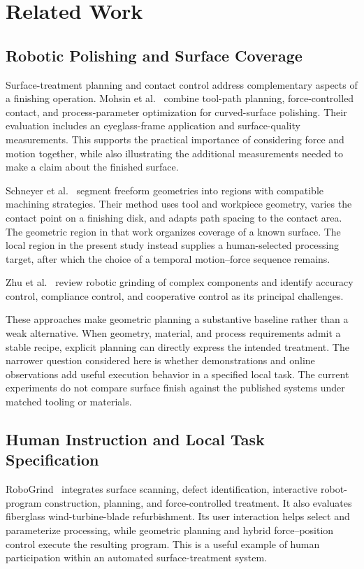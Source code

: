 \chapter{Related Work}
\label{chap:related_work}

\section{Robotic Polishing and Surface Coverage}
Surface-treatment planning and contact control address complementary aspects of a finishing operation. Mohsin et al.~\cite{mohsin2019path} combine tool-path planning, force-controlled contact, and process-parameter optimization for curved-surface polishing. Their evaluation includes an eyeglass-frame application and surface-quality measurements. This supports the practical importance of considering force and motion together, while also illustrating the additional measurements needed to make a claim about the finished surface.

Schneyer et al.~\cite{schneyer2023segmentation} segment freeform geometries into regions with compatible machining strategies. Their method uses tool and workpiece geometry, varies the contact point on a finishing disk, and adapts path spacing to the contact area. The geometric region in that work organizes coverage of a known surface. The local region in the present study instead supplies a human-selected processing target, after which the choice of a temporal motion--force sequence remains.

Zhu et al.~\cite{zhu2020robotic} review robotic grinding of complex components and identify accuracy control, compliance control, and cooperative control as its principal challenges.

These approaches make geometric planning a substantive baseline rather than a weak alternative. When geometry, material, and process requirements admit a stable recipe, explicit planning can directly express the intended treatment. The narrower question considered here is whether demonstrations and online observations add useful execution behavior in a specified local task. The current experiments do not compare surface finish against the published systems under matched tooling or materials.

\section{Human Instruction and Local Task Specification}
RoboGrind~\cite{alt2024robogrind} integrates surface scanning, defect identification, interactive robot-program construction, planning, and force-controlled treatment. It also evaluates fiberglass wind-turbine-blade refurbishment. Its user interaction helps select and parameterize processing, while geometric planning and hybrid force--position control execute the resulting program. This is a useful example of human participation within an automated surface-treatment system.

